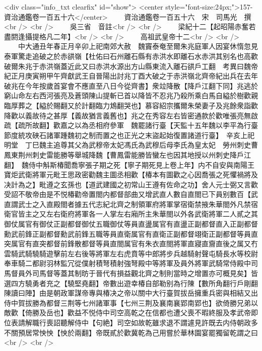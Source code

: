 <div class="info_txt clearfix" id="show">
<center style="font-size:24px;">157-資治通鑑卷一百五十六</center>
  　　資治通鑑卷一百五十六　宋　司馬光　撰<br />
<br />
　　吳三省　音註<br />
<br />
　　梁紀十二【起昭陽赤奮若盡閼逢攝提格凡二年】<br />
<br />
　　高祖武皇帝十二<br />
<br />
　　中大通丑年春正月辛卯上祀南郊大赦　魏竇泰奄至爾朱兆庭軍人因宴休惰忽見泰軍驚走追破之於赤谼嶺【杜佑曰石州離石縣有赤洪水即離石水赤洪其别名也高歡破爾朱兆于赤洪嶺蓋近此又曰赤洪水源出方山縣東流入離石谼戶工翻　考異曰魏帝紀正月庚寅朔甲午齊獻武王自晉陽出討兆丁酉大破之于赤洪嶺北齊帝紀出兵在去年破兆在今年按歲首宴會不應直至八日今從齊書】衆竝降散【降戶江翻下同】兆逃於窮山命左右西河張亮及蒼頭陳山提斬已首以降皆不忍兆乃殺所乘白馬自縊於樹歡親臨厚葬之【縊於賜翻又於計翻臨力鴆翻哭也】慕容紹宗攜爾朱榮妻子及兆餘衆詣歡降歡以義故待之甚厚【義故猶言義舊也】兆之在秀容左右皆密通款於歡唯張亮無啟疏【疏所故翻】歡嘉之以為丞相府參軍　魏罷諸行臺【天監十五年魏以李平為行臺節度統攻硤石諸軍踵魏初之制而置之也正光之末盜起始復置諸道行臺】　辛亥上祀明堂　丁巳魏主追尊其父為武穆帝太妃馮氏為武穆后母李氏為皇太妃　勞州刺史曹鳳東荆州刺史雷能勝等舉城降魏【曹鳳雷能勝皆蠻左也因其地授以州刺史降戶江翻】　魏侍中斛斯椿聞喬寧張子期之死【寧子期死見上卷上年】内不自安與南陽王寶炬武衛將軍元毗王思政密勸魏主圖丞相歡【椿本有圖歡之心因喬張之死懼禍將及决計為之】毗遵之玄孫也【道武建國之初常山王遵有佐命之功】舍人元士弼又言歡受詔不敬帝由是不悦椿勸帝置閤内都督部曲又增武直人數自直閤已下員别數百【武直謂武士之入直殿閤者據五代志紀北齊之制領軍府將軍掌宿衛禁掖朱華閤外凡禁宿衛官皆主之又左右衛府將軍各一人掌左右廂所主朱華閤以外各武衛將軍二人貳之其御仗属官有御仗正副都督御仗五職御仗等員直盪属官有直盪正副都督直入正副都督勳武前鋒正副都督勳武前鋒五職等員直衛属官有直衛正副都督翊衛正副都督等員直突属官有直突都督前鋒散都督等員直閤属官有朱衣直閤將軍直寢直齎直後之属又冇雲騎武騎驍騎遊擊前左右後等將軍左右虎賁等中郎將步兵越騎射聲屯騎長水等校尉奉車騎二都尉羽林監冗從僕射積弩積射強弩殿中等將軍及員外將軍武騎常侍殿中司馬督員外司馬督等蓋其制昉于晉代有損益觀北齊之制則當時之增置亦可概見矣】皆選四方驍勇者充之【驍堅堯翻】帝數出遊幸椿自部勒别為行陳【數所角翻行戶剛翻陳讀曰陣】由是朝政軍謀帝專與椿决之帝以關中大行臺賀拔岳擁重兵密與相結又出侍中賀拔勝為都督三荆等七州諸軍事【七州三荆及襄南襄郢南郢也】欲倚勝兄弟以敵歡【倚勝及岳也】歡益不悦侍中司空高乾之在信都也遭父喪不暇終服及孝武帝即位表請解職行喪詔聽解侍中【句絶】司空如故乾雖求退不謂遽見許既去内侍朝政多不關預居常怏怏【怏於兩翻】帝既貳於歡冀乾為己用嘗於華林園宴罷獨留乾謂之曰<br />
<br />

